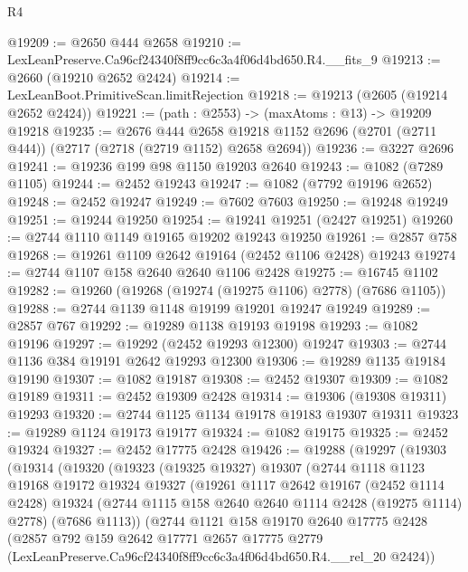 \begin{lexlean}{R4}
\begin{coremodule}
@19209 := @2650 @444 @2658
@19210 := LexLeanPreserve.Ca96cf24340f8ff9cc6c3a4f06d4bd650.R4.__fits_9
@19213 := @2660 (@19210 @2652 @2424)
@19214 := LexLeanBoot.PrimitiveScan.limitRejection
@19218 := @19213 (@2605 (@19214 @2652 @2424))
@19221 := (path : @2553) -> (maxAtoms : @13) -> @19209 @19218
@19235 := @2676
    @444
    @2658
    @19218
    @1152
    @2696
    (@2701 (@2711 @444))
    (@2717 (@2718 (@2719 @1152) @2658 @2694))
@19236 := @3227 @2696
@19241 := @19236 @199 @98 @1150 @19203 @2640
@19243 := @1082 (@7289 @1105)
@19244 := @2452 @19243
@19247 := @1082 (@7792 @19196 @2652)
@19248 := @2452 @19247
@19249 := @7602 @7603
@19250 := @19248 @19249
@19251 := @19244 @19250
@19254 := @19241 @19251 (@2427 @19251)
@19260 := @2744 @1110 @1149 @19165 @19202 @19243 @19250
@19261 := @2857 @758
@19268 := @19261 @1109 @2642 @19164 (@2452 @1106 @2428) @19243
@19274 := @2744 @1107 @158 @2640 @2640 @1106 @2428
@19275 := @16745 @1102
@19282 := @19260 (@19268 (@19274 (@19275 @1106) @2778) (@7686 @1105))
@19288 := @2744 @1139 @1148 @19199 @19201 @19247 @19249
@19289 := @2857 @767
@19292 := @19289 @1138 @19193 @19198
@19293 := @1082 @19196
@19297 := @19292 (@2452 @19293 @12300) @19247
@19303 := @2744 @1136 @384 @19191 @2642 @19293 @12300
@19306 := @19289 @1135 @19184 @19190
@19307 := @1082 @19187
@19308 := @2452 @19307
@19309 := @1082 @19189
@19311 := @2452 @19309 @2428
@19314 := @19306 (@19308 @19311) @19293
@19320 := @2744 @1125 @1134 @19178 @19183 @19307 @19311
@19323 := @19289 @1124 @19173 @19177
@19324 := @1082 @19175
@19325 := @2452 @19324
@19327 := @2452 @17775 @2428
@19426 := @19288
    (@19297
      (@19303
        (@19314
          (@19320
            (@19323
              (@19325 @19327)
              @19307
              (@2744
                @1118
                @1123
                @19168
                @19172
                @19324
                @19327
                (@19261
                  @1117
                  @2642
                  @19167
                  (@2452 @1114 @2428)
                  @19324
                  (@2744 @1115 @158 @2640 @2640 @1114 @2428 (@19275 @1114) @2778)
                  (@7686 @1113))
                (@2744
                  @1121
                  @158
                  @19170
                  @2640
                  @17775
                  @2428
                  (@2857
                    @792
                    @159
                    @2642
                    @17771
                    @2657
                    @17775
                    @2779
                    (LexLeanPreserve.Ca96cf24340f8ff9cc6c3a4f06d4bd650.R4.__rel_20 @2424))

\end{coremodule}
\end{lexlean}
